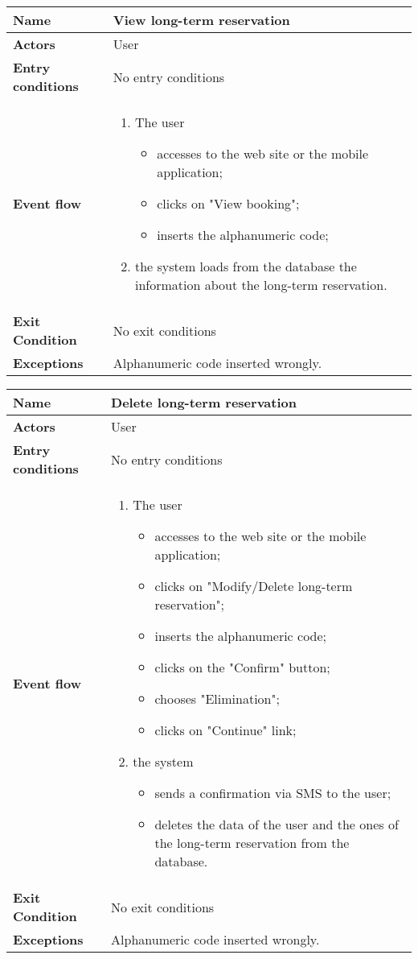 \vspace{20pt}
\noindent
\begin{tabular}{l l}
 \textbf {Name} & View long-term reservation  \\ \hline
 \textbf{Actors} & User \\ \hline
 \textbf{Entry conditions} & No entry conditions \\ \hline
 \textbf{Event flow} & 
 \parbox{0.9\textwidth}{
 \begin{enumerate}
 \item The user
 \begin{itemize}
 \item accesses to the web site or the mobile application;
 \item clicks on "View booking";
 \item inserts the alphanumeric code;
 \end{itemize}
 \item the system loads from the database the information about the long-term reservation.
 \end{enumerate}
 } \\ \hline
 \textbf{Exit Condition} & No exit conditions \\ \hline
 \textbf{Exceptions} & Alphanumeric code inserted wrongly.
\end{tabular}

\vspace{20pt}
\noindent
\begin{tabular}{l l}
 \textbf {Name} & Delete long-term reservation  \\ \hline
 \textbf{Actors} & User \\ \hline
 \textbf{Entry conditions} & No entry conditions \\ \hline
 \textbf{Event flow} & 
 \parbox{0.9\textwidth}{
 \begin{enumerate}
 \item The user
 \begin{itemize}
 \item accesses to the web site or the mobile application;
 \item clicks on "Modify/Delete long-term reservation";
 \item inserts the alphanumeric code;
 \item clicks on the "Confirm" button;
 \item chooses "Elimination";
 \item clicks on "Continue" link;
 \end{itemize}
 \item the system
 \begin{itemize}
 \item sends a confirmation via SMS to the user;
 \item deletes the data of the user and the ones of the long-term reservation from the database.
 \end{itemize}
 \end{enumerate}
 } \\ \hline
 \textbf{Exit Condition} & No exit conditions \\ \hline
 \textbf{Exceptions} & Alphanumeric code inserted wrongly.
\end{tabular}

